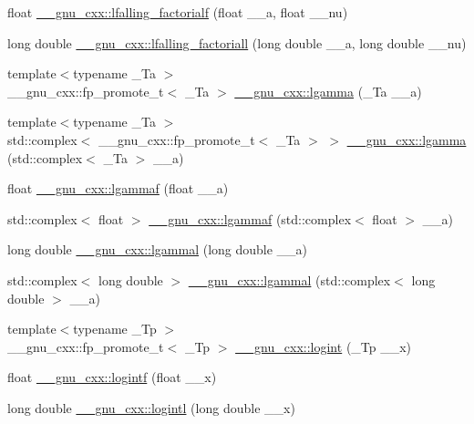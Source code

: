 \begin{DoxyCompactItemize}
float \hyperlink{group__mathsf__gnu_ga59ad7045c90aa1e3bc671e2eb6b8a2a7}{\+\_\+\+\_\+gnu\+\_\+cxx\+::lfalling\+\_\+factorialf} (float \+\_\+\+\_\+a, float \+\_\+\+\_\+nu)
\item 
long double \hyperlink{group__mathsf__gnu_gaa69b6c70e000b073d7f0f17199b1feb0}{\+\_\+\+\_\+gnu\+\_\+cxx\+::lfalling\+\_\+factoriall} (long double \+\_\+\+\_\+a, long double \+\_\+\+\_\+nu)
\item 
{\footnotesize template$<$typename \+\_\+\+Ta $>$ }\\\+\_\+\+\_\+gnu\+\_\+cxx\+::fp\+\_\+promote\+\_\+t$<$ \+\_\+\+Ta $>$ \hyperlink{group__mathsf__gnu_ga40fa5127f7c419ed1d8f1c6a6f96ea9b}{\+\_\+\+\_\+gnu\+\_\+cxx\+::lgamma} (\+\_\+\+Ta \+\_\+\+\_\+a)
\item 
{\footnotesize template$<$typename \+\_\+\+Ta $>$ }\\std\+::complex$<$ \+\_\+\+\_\+gnu\+\_\+cxx\+::fp\+\_\+promote\+\_\+t$<$ \+\_\+\+Ta $>$ $>$ \hyperlink{group__mathsf__gnu_ga93530dc48fbf301835215cdffedc42d8}{\+\_\+\+\_\+gnu\+\_\+cxx\+::lgamma} (std\+::complex$<$ \+\_\+\+Ta $>$ \+\_\+\+\_\+a)
\item 
float \hyperlink{group__mathsf__gnu_ga37956b360838b5b2f98c8e5cfd15d307}{\+\_\+\+\_\+gnu\+\_\+cxx\+::lgammaf} (float \+\_\+\+\_\+a)
\item 
std\+::complex$<$ float $>$ \hyperlink{group__mathsf__gnu_ga5b10ee6e92d8707a151b00086889b2ea}{\+\_\+\+\_\+gnu\+\_\+cxx\+::lgammaf} (std\+::complex$<$ float $>$ \+\_\+\+\_\+a)
\item 
long double \hyperlink{group__mathsf__gnu_gabc66f234f4554cd5ff878792cc85bd37}{\+\_\+\+\_\+gnu\+\_\+cxx\+::lgammal} (long double \+\_\+\+\_\+a)
\item 
std\+::complex$<$ long double $>$ \hyperlink{group__mathsf__gnu_ga5f12f60afe9a47f4ca04964f642bbf0d}{\+\_\+\+\_\+gnu\+\_\+cxx\+::lgammal} (std\+::complex$<$ long double $>$ \+\_\+\+\_\+a)
\item 
{\footnotesize template$<$typename \+\_\+\+Tp $>$ }\\\+\_\+\+\_\+gnu\+\_\+cxx\+::fp\+\_\+promote\+\_\+t$<$ \+\_\+\+Tp $>$ \hyperlink{group__mathsf__gnu_ga1c0fe0f4cb72041f24db82dc7e47df11}{\+\_\+\+\_\+gnu\+\_\+cxx\+::logint} (\+\_\+\+Tp \+\_\+\+\_\+x)
\item 
float \hyperlink{group__mathsf__gnu_gab878da3ba2f5c1d49d96eadde533b233}{\+\_\+\+\_\+gnu\+\_\+cxx\+::logintf} (float \+\_\+\+\_\+x)
\item 
long double \hyperlink{group__mathsf__gnu_gab17f5cadc8f77ba2666d0d5ecc78de5d}{\+\_\+\+\_\+gnu\+\_\+cxx\+::logintl} (long double \+\_\+\+\_\+x)

\end{DoxyCompactItemize}
